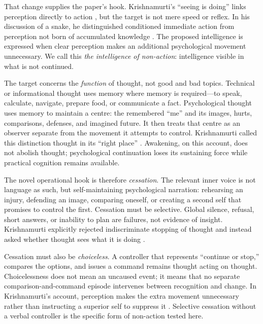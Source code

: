 \documentclass[10pt,twocolumn]{article}
\begin{document}
That change supplies the paper's hook. Krishnamurti's ``seeing is doing'' links
perception directly to action \citep{krishnamurti1969seeing}, but the target is
not mere speed or reflex. In his discussion of a snake, he distinguished
conditioned immediate action from perception not born of accumulated knowledge
\citep{krishnamurti1980computers}. The proposed intelligence is expressed when
clear perception makes an additional psychological movement unnecessary. We call
this \emph{the intelligence of non-action}: intelligence visible in what is not
continued.

The target concerns the \emph{function} of thought, not good and bad topics.
Technical or informational thought uses memory where memory is required---to
speak, calculate, navigate, prepare food, or communicate a fact. Psychological
thought uses memory to maintain a centre: the remembered ``me'' and its images,
hurts, comparisons, defenses, and imagined future. It then treats that centre as
an observer separate from the movement it attempts to control. Krishnamurti
called this distinction thought in its ``right place''
\citep{krishnamurti1973thoughtplace,krishnamurti1982thinking}. Awakening, on this
account, does not abolish thought; psychological continuation loses its sustaining
force while practical cognition remains available.

The novel operational hook is therefore \emph{cessation}. The relevant inner
voice is not language as such, but self-maintaining psychological narration:
rehearsing an injury, defending an image, comparing oneself, or creating a second
self that promises to control the first. Cessation must be selective. Global
silence, refusal, short answers, or inability to plan are failures, not evidence
of insight. Krishnamurti explicitly rejected indiscriminate stopping of thought
and instead asked whether thought sees what it is doing
\citep{krishnamurti1979fear}.

Cessation must also be \emph{choiceless}. A controller that represents ``continue
or stop,'' compares the options, and issues a command remains thought acting on
thought. Choicelessness does not mean an uncaused event; it means that no separate
comparison-and-command episode intervenes between recognition and change. In
Krishnamurti's account, perception makes the extra movement unnecessary rather
than instructing a superior self to suppress it
\citep{krishnamurti1969stanford,krishnamurti2006order}. Selective cessation
without a verbal controller is the specific form of non-action tested here.
\end{document}
